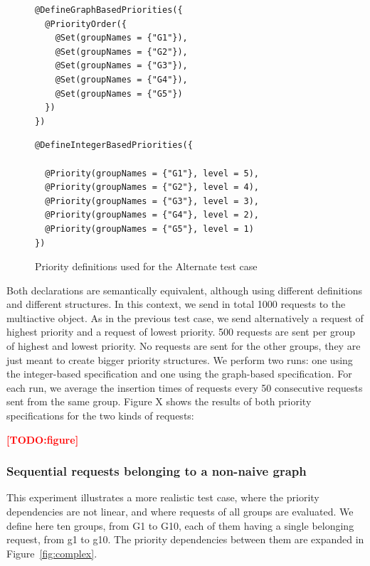 \documentclass[11pt]{report}
\newcommand{\TODO}[1]{\textcolor{red}{\textbf{[TODO:#1]}}}
\begin{document}
\begin{figure}[!ht]
	\lstset{language=java, numberstyle=\tiny, stepnumber=1, numbersep=5pt, basicstyle=\footnotesize}
	\begin{minipage}{0.41\textwidth}
	\begin{lstlisting}[frame=single]
@DefineGraphBasedPriorities({
  @PriorityOrder({
    @Set(groupNames = {"G1"}),
    @Set(groupNames = {"G2"}),
    @Set(groupNames = {"G3"}),
    @Set(groupNames = {"G4"}),
    @Set(groupNames = {"G5"})
  })
})
 	\end{lstlisting}
 	\end{minipage}
 	\nointerlineskip
	\begin{minipage}{0.57\textwidth}
	\begin{lstlisting}[frame=single]
@DefineIntegerBasedPriorities({

  @Priority(groupNames = {"G1"}, level = 5),
  @Priority(groupNames = {"G2"}, level = 4),
  @Priority(groupNames = {"G3"}, level = 3),
  @Priority(groupNames = {"G4"}, level = 2),
  @Priority(groupNames = {"G5"}, level = 1)
})
 	\end{lstlisting}
 	\end{minipage}	
	\caption{Priority definitions used for the Alternate test case}
	\label{fig:alternate}
\end{figure}

Both declarations are semantically equivalent, although using different definitions and different structures. In this context, we send in total 1000 requests to the multiactive object. As in the previous test case, we send alternatively a request of highest priority and a request of lowest priority. 500 requests are sent per group of highest and lowest priority. No requests are sent for the other groups, they are just meant to create bigger priority structures. We perform two runs: one using the integer-based specification and one using the graph-based specification. For each run, we average the insertion times of requests every 50 consecutive requests sent from the same group. Figure X shows the results of both priority specifications for the two kinds of requests:

\TODO{figure}

\subsubsection{Sequential requests belonging to a non-naive graph}
This experiment illustrates a more realistic test case, where the priority dependencies are not linear, and where requests of all groups are evaluated. We define here ten groups, from G1 to G10, each of them having a single belonging request, from g1 to g10. The priority dependencies between them are expanded in Figure~\ref{fig:complex}.
\end{document}
